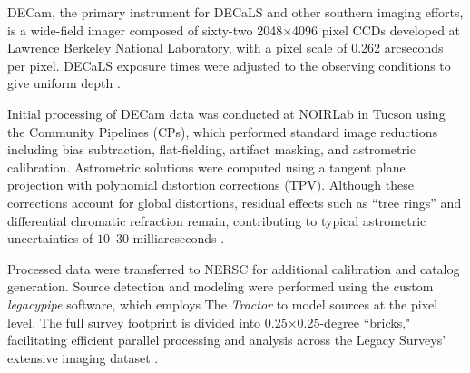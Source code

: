 \documentclass[usenatbib]{mnras}   %
\newcommand{\dstn}[1]{{\color{teal}{#1}}}
\begin{document}
DECam, the primary instrument for DECaLS and other southern imaging efforts, is a wide-field imager composed of sixty-two 2048×4096 pixel CCDs developed at Lawrence Berkeley National Laboratory, with a pixel scale of 0.262 arcseconds per pixel. DECaLS exposure times were adjusted to the observing conditions to give uniform depth \citep{Burleigh_2020}.



Initial processing of DECam data was conducted at NOIRLab in Tucson using the Community Pipelines (CPs), which performed standard image reductions including bias subtraction, flat-fielding, artifact masking, and astrometric calibration. Astrometric solutions were computed using a tangent plane projection with polynomial distortion corrections (TPV). Although these corrections account for global distortions, residual effects such as ``tree rings” and differential chromatic refraction remain, contributing to typical astrometric uncertainties of $10–30$ milliarcseconds \citep{legacy2019}.

Processed data were transferred to NERSC for additional calibration and catalog generation. Source detection and modeling were performed using the custom \emph{legacypipe} software, which employs The \emph{Tractor} to model sources at the pixel level. The full survey footprint is divided into 0.25×0.25-degree ``bricks," facilitating efficient parallel processing and analysis across the Legacy Surveys' extensive imaging dataset \citep{legacy2019}.
\end{document}
